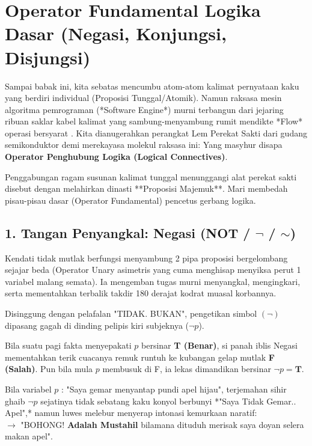 \section{Operator Fundamental Logika Dasar (Negasi, Konjungsi, Disjungsi)}

Sampai babak ini, kita sebatas mencumbu atom-atom kalimat pernyataan kaku yang berdiri individual (Proposisi Tunggal/Atomik). Namun raksasa mesin algoritma pemrograman (*Software Engine*) murni terbangun dari jejaring ribuan saklar kabel kalimat yang sambung-menyambung rumit mendikte *Flow* operasi bersyarat \cite{rosen2019}. Kita dianugerahkan perangkat Lem Perekat Sakti dari gudang semikonduktor demi merekayasa molekul raksasa ini: Yang masyhur disapa \textbf{Operator Penghubung Logika (Logical Connectives)}. 

Penggabungan ragam susunan kalimat tunggal menunggangi alat perekat sakti disebut dengan melahirkan dinasti **Proposisi Majemuk**. Mari membedah pisau-pisau dasar (Operator Fundamental) pencetus gerbang logika.

\subsection{1. Tangan Penyangkal: Negasi (NOT / $\neg$ / $\sim$)}

Kendati tidak mutlak berfungsi menyambung 2 pipa proposisi bergelombang sejajar beda (Operator Unary asimetris yang cuma menghisap menyiksa perut 1 variabel malang semata). Ia mengemban tugas murni menyangkal, mengingkari, serta mementahkan terbalik takdir 180 derajat kodrat muasal korbannya.

Disinggung dengan pelafalan "TIDAK. BUKAN", pengetikan simbol $(\neg)$ dipasang gagah di dinding pelipis kiri subjeknya ($\neg p$).
\begin{definisi}
Bila suatu pagi fakta menyepakati $p$ bersinar \textbf{T (Benar)}, si panah iblis Negasi mementahkan terik cuacanya remuk runtuh ke kubangan gelap mutlak \textbf{F (Salah)}. Pun bila mula $p$ membusuk di F, ia lekas dimandikan bersinar $\neg p = \textbf{T}$.
\end{definisi}

\begin{contoh}
Bila variabel $p$ : "Saya gemar menyantap pundi apel hijau", terjemahan sihir ghaib $\neg p$ sejatinya tidak sebatang kaku konyol berbunyi *"Saya Tidak Gemar.. Apel",* namun luwes melebur menyerap intonasi kemurkaan naratif: \\
$\rightarrow$ "BOHONG! \textbf{Adalah Mustahil} bilamana dituduh merisak saya doyan selera makan apel".
\end{contoh}


